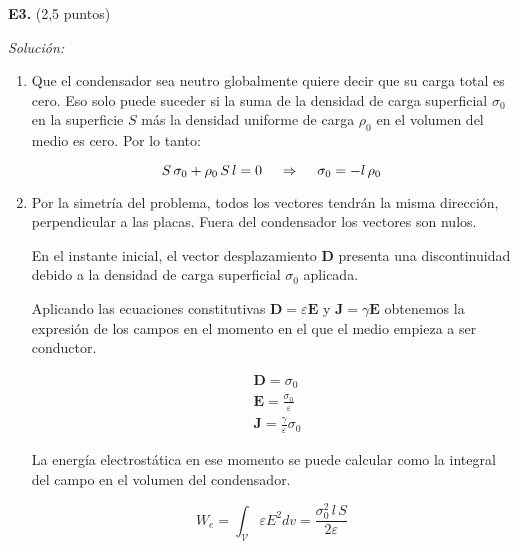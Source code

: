 \textbf{E3.} (2,5 puntos)


\vspace{20px}
\textit{Solución:}
\\

\begin{enumerate}
[label=\alph*)]
    \item Que el condensador sea neutro globalmente quiere decir que su carga total es cero. Eso solo puede suceder si la suma de la densidad de carga superficial
    $\sigma_0$ en la superficie $S$ más la densidad uniforme de carga $\rho_0$ en el volumen del medio es cero. Por lo tanto:

    \begin{equation*}
        S \, \sigma_0 + \rho_0 \, S \, l = 0 \hspace{12px} \Rightarrow \hspace{12px} \sigma_0 = - l \, \rho_0
    \end{equation*}


    \vspace{20px}

    \item Por la simetría del problema, todos los vectores tendrán la misma dirección, perpendicular a las placas. Fuera del condensador los vectores son nulos.

    En el instante inicial, el vector desplazamiento $\textbf{D}$ presenta una discontinuidad debido a la densidad de carga superficial $\sigma_0$ aplicada.

    Aplicando las ecuaciones constitutivas $\textbf{D} = \varepsilon \textbf{E}$ y $\textbf{J} = \gamma \textbf{E}$ obtenemos la expresión de los campos en el momento
    en el que el medio empieza a ser conductor.

    \begin{align*}
        &\textbf{D}  = \sigma_0 \\[6px]
        & \textbf{E} = \frac{\sigma_0}{\varepsilon} \\[6px]
        & \textbf{J}  = \frac{\gamma}{\varepsilon} \sigma_0
    \end{align*}

    La energía electrostática en ese momento se puede calcular como la integral del campo en el volumen del condensador.

    \begin{equation*}
        W_e = \int_{\mathcal{V}}\varepsilon E^2 dv =  \frac{\sigma_0^2 \, l \, S}{2 \varepsilon}
    \end{equation*}


\end{enumerate}
